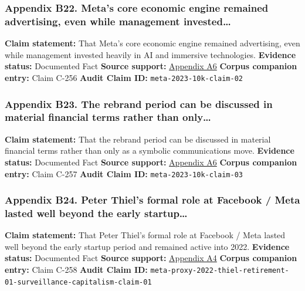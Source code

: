 \documentclass[
  american,
  11pt,
  letterpaper,
]{article}
\begin{document}
\subsubsection{Appendix B22. Meta's core economic engine remained
advertising, even while management
invested\ldots{}}\label{ch-01-appendix-b22-meta-s-core-economic-engine-remained-advertising-even-while-management-invested}

\textbf{Claim statement:} That Meta's core economic engine remained
advertising, even while management invested heavily in AI and immersive
technologies. \textbf{Evidence status:} Documented Fact \textbf{Source
support:}
\hyperref[ch-01-appendix-a6-meta-platforms-inc-2023-annual-report-form-10-k]{Appendix
A6} \textbf{Corpus companion entry:} Claim C-256 \textbf{Audit Claim
ID:} \texttt{meta-2023-10k-claim-02}

\subsubsection{Appendix B23. The rebrand period can be discussed in
material financial terms rather than
only\ldots{}}\label{ch-01-appendix-b23-the-rebrand-period-can-be-discussed-in-material-financial-terms-rather-than-only}

\textbf{Claim statement:} That the rebrand period can be discussed in
material financial terms rather than only as a symbolic communications
move. \textbf{Evidence status:} Documented Fact \textbf{Source support:}
\hyperref[ch-01-appendix-a6-meta-platforms-inc-2023-annual-report-form-10-k]{Appendix
A6} \textbf{Corpus companion entry:} Claim C-257 \textbf{Audit Claim
ID:} \texttt{meta-2023-10k-claim-03}

\subsubsection{Appendix B24. Peter Thiel's formal role at Facebook /
Meta lasted well beyond the early
startup\ldots{}}\label{ch-01-appendix-b24-peter-thiel-s-formal-role-at-facebook-meta-lasted-well-beyond-the-early-startup}

\textbf{Claim statement:} That Peter Thiel's formal role at Facebook /
Meta lasted well beyond the early startup period and remained active
into 2022. \textbf{Evidence status:} Documented Fact \textbf{Source
support:}
\hyperref[ch-01-appendix-a4-meta-platforms-inc-2022-definitive-proxy-statement]{Appendix
A4} \textbf{Corpus companion entry:} Claim C-258 \textbf{Audit Claim
ID:}
\texttt{meta-proxy-2022-thiel-retirement-01-surveillance-capitalism-claim-01}
\end{document}

